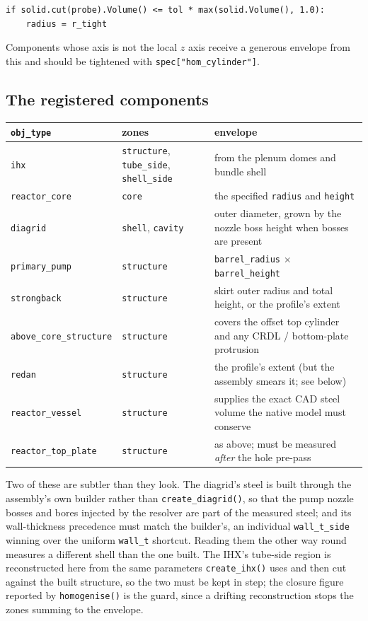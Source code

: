 \documentclass[9pt,a4paper]{extarticle}
\newcommand{\code}[1]{\texttt{\small #1}}
\begin{document}
\begin{lstlisting}[style=py]
if solid.cut(probe).Volume() <= tol * max(solid.Volume(), 1.0):
    radius = r_tight
\end{lstlisting}

\noindent
Components whose axis is not the local $z$ axis receive a generous envelope from
this and should be tightened with \code{spec["hom\_cylinder"]}.

\subsection{The registered components}

\begin{center}
\begin{tabular}{@{}llp{7.6cm}@{}}
\toprule
\code{obj\_type} & zones & envelope \\
\midrule
\code{ihx} & \code{structure}, \code{tube\_side}, \code{shell\_side} &
  from the plenum domes and bundle shell \\
\code{reactor\_core} & \code{core} &
  the specified \code{radius} and \code{height} \\
\code{diagrid} & \code{shell}, \code{cavity} &
  outer diameter, grown by the nozzle boss height when bosses are present \\
\code{primary\_pump} & \code{structure} &
  \code{barrel\_radius} $\times$ \code{barrel\_height} \\
\code{strongback} & \code{structure} &
  skirt outer radius and total height, or the profile's extent \\
\code{above\_core\_structure} & \code{structure} &
  covers the offset top cylinder and any CRDL / bottom-plate protrusion \\
\code{redan} & \code{structure} &
  the profile's extent (but the assembly smears it; see below) \\
\code{reactor\_vessel} & \code{structure} &
  supplies the exact CAD steel volume the native model must conserve \\
\code{reactor\_top\_plate} & \code{structure} &
  as above; must be measured \emph{after} the hole pre-pass \\
\bottomrule
\end{tabular}
\end{center}

\noindent
Two of these are subtler than they look. The diagrid's steel is built through
the assembly's own builder rather than \code{create\_diagrid()}, so that the
pump nozzle bosses and bores injected by the resolver are part of the measured
steel; and its wall-thickness precedence must match the builder's, an individual
\code{wall\_t\_side} winning over the uniform \code{wall\_t} shortcut. Reading
them the other way round measures a different shell than the one built. The
IHX's tube-side region is reconstructed here from the same parameters
\code{create\_ihx()} uses and then cut against the built structure, so the two
must be kept in step; the closure figure reported by \code{homogenise()} is the
guard, since a drifting reconstruction stops the zones summing to the envelope.
\end{document}
